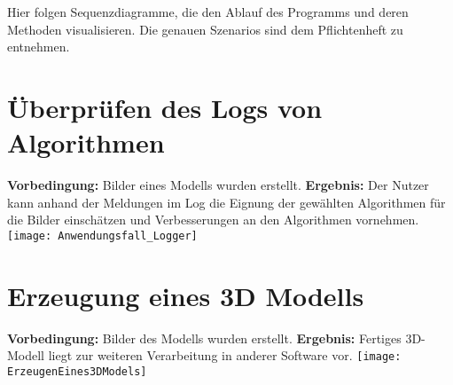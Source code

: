 Hier folgen Sequenzdiagramme, die den Ablauf des Programms und deren Methoden visualisieren.
Die genauen Szenarios sind dem Pflichtenheft zu entnehmen.
\section{Überprüfen des Logs von Algorithmen}
\graphicspath{{./img/sequ/}}
\textbf{Vorbedingung:} Bilder eines Modells wurden erstellt. \newline
\textbf{Ergebnis:} Der Nutzer kann anhand der Meldungen im Log die Eignung der gewählten Algorithmen für die Bilder einschätzen und Verbesserungen an den Algorithmen vornehmen. \newline
\texttt{[image: Anwendungsfall\_Logger]}
\newpage
\section{Erzeugung eines 3D Modells}
\textbf{Vorbedingung:} Bilder des Modells wurden erstellt. \newline
\textbf{Ergebnis:} Fertiges 3D-Modell liegt zur weiteren Verarbeitung in anderer Software vor. \newline
\texttt{[image: ErzeugenEines3DModels]}